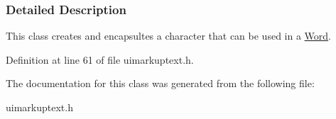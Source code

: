 \subsubsection{Detailed Description}
This class creates and encapsultes a character that can be used in a \hyperlink{classMezzanine_1_1UI_1_1Word}{Word}. 

Definition at line 61 of file uimarkuptext.h.



The documentation for this class was generated from the following file:\begin{DoxyCompactItemize}
\item 
uimarkuptext.h\end{DoxyCompactItemize}
